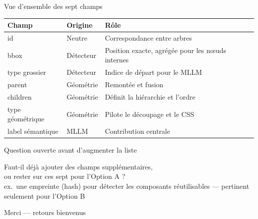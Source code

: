 \documentclass[11pt,aspectratio=169]{beamer}
\begin{document}
\begin{frame}{Vue d'ensemble des sept champs}
  \small
  \renewcommand{\arraystretch}{1.5}
  \begin{tabular}{@{}p{3.4cm}p{2.6cm}p{6.5cm}@{}}
    \toprule
    \textbf{Champ} & \textbf{Origine} & \textbf{Rôle} \\
    \midrule
    id & \textcolor{softgray}{Neutre} & Correspondance entre arbres \\
    bbox & \textcolor{nodecoral}{Détecteur} & Position exacte, agrégée pour les nœuds internes \\
    type grossier & \textcolor{nodecoral}{Détecteur} & Indice de départ pour le MLLM \\
    parent & \textcolor{nodeteal}{Géométrie} & Remontée et fusion \\
    children & \textcolor{nodeteal}{Géométrie} & Définit la hiérarchie et l'ordre \\
    type géométrique & \textcolor{nodeteal}{Géométrie} & Pilote le découpage et le CSS \\
    label sémantique & \textcolor{nodepurple}{MLLM} & Contribution centrale \\
    \bottomrule
  \end{tabular}
\end{frame}

\begin{frame}{Question ouverte avant d'augmenter la liste}
  \begin{center}
  \large Faut-il déjà ajouter des champs supplémentaires,\\ ou rester sur ces sept pour l'Option A ?
  \\[6mm]
  \small ex.\ une empreinte (hash) pour détecter les composants réutilisables --- pertinent seulement pour l'Option B
  \end{center}
\end{frame}

\begin{frame}[standout]
  Merci --- retours bienvenus
\end{frame}
\end{document}
